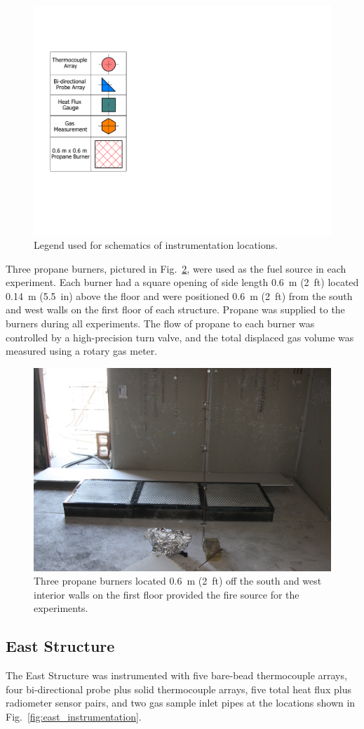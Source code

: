 \documentclass[12pt,oneside]{book}
\begin{document}
\begin{figure}[!ht]
	\includegraphics[width=0.25\columnwidth]{../Figures/Floor_Plans/Instrumentation_Legend}
	\caption[Instrumentation legend.]{Legend used for schematics of instrumentation locations.}
	\label{fig:Instrumentation_Legend}
\end{figure}

Three propane burners, pictured in Fig.~\ref{fig:burners}, were used as the fuel source in each experiment. Each burner had a square opening of side length 0.6~m (2~ft) located 0.14~m (5.5~in) above the floor and were positioned 0.6~m (2~ft) from the south and west walls on the first floor of each structure. Propane was supplied to the burners during all experiments. The flow of propane to each burner was controlled by a high-precision turn valve, and the total displaced gas volume was measured using a rotary gas meter.

\begin{figure}[!ht]
	\includegraphics[width=0.9\columnwidth]{../Figures/Pictures/burners}
	\caption[Three propane burners used as fire source.]{Three propane burners located 0.6~m (2~ft) off the south and west interior walls on the first floor provided the fire source for the experiments.}
	\label{fig:burners}
\end{figure}

\FloatBarrier

\subsection{East Structure}
The East Structure was instrumented with five bare-bead thermocouple arrays, four bi-directional probe plus solid thermocouple arrays, five total heat flux plus radiometer sensor pairs, and two gas sample inlet pipes at the locations shown in Fig.~\ref{fig:east_instrumentation}.
\end{document}
